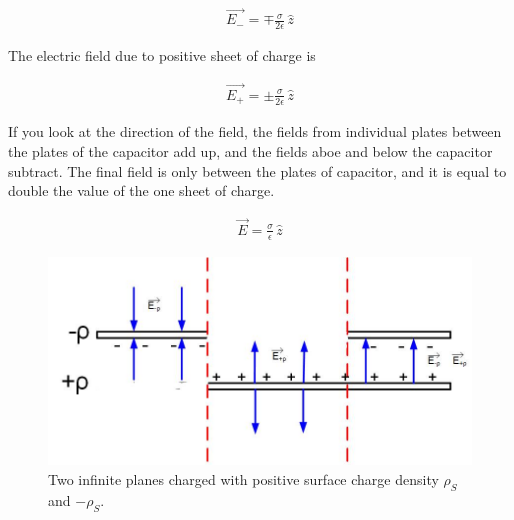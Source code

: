 \documentclass{ximera}
\begin{document}
\begin{eqnarray}
 \vec{E_-}  = \mp \frac{\sigma}{2 \epsilon } \, \hat{z}
\end{eqnarray}

The electric field due to positive sheet of charge is


\begin{eqnarray}
 \vec{E_+}  = \pm \frac{\sigma}{2 \epsilon } \, \hat{z}
\end{eqnarray}

If you look at the direction of the field, the fields from individual plates between the plates of the capacitor add up, and the fields aboe and below the capacitor subtract. The final field is only between the plates of capacitor, and it is equal to double the value of the one sheet of charge.




\begin{eqnarray}
 \vec{E}  = \frac{\sigma}{ \epsilon } \, \hat{z}
\end{eqnarray}


\begin{figure}[htbp]
\begin{center}
\includegraphics[scale=0.8]{../jpg/Infinite_Parallel_Plates1.jpg}
\end{center}
\caption{Two infinite planes charged with positive surface charge density $\rho_S$ and $-\rho_S.$}
\label{Gaus2Plane}
\end{figure}
\end{document}
